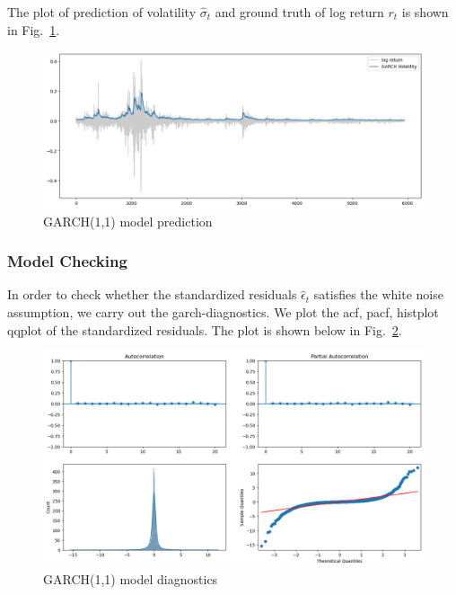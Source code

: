 \documentclass[runningheads]{llncs}
\begin{document}
The plot of prediction of volatility $\hat{\sigma}_t$ and ground truth of log return $r_t$ is shown in Fig.~\ref{fig:10}.


\begin{figure}[htbp]
    \centering
    \includegraphics[width=\textwidth]{../img/garch_train_pred.png}
    \caption{GARCH(1,1) model prediction}
    \label{fig:10}
\end{figure}

\subsubsection{Model Checking}

In order to check whether the standardized residuals $\hat{\epsilon}_t$ satisfies the white noise assumption, we carry out the garch-diagnostics. We plot the acf, pacf, histplot qqplot of the standardized residuals.
The plot is shown below in Fig.~\ref{fig:11}.


\begin{figure}[htbp]
    \centering
    \includegraphics[width=\textwidth]{../img/garch_diagnostics.png}
    \caption{GARCH(1,1) model diagnostics}
    \label{fig:11}
\end{figure}
\end{document}

